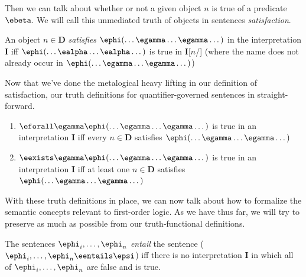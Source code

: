 Then we can talk about whether or not a given object $n$ is true of a predicate
$\ebeta$. We will call this unmediated truth of objects in sentences
\emph{satisfaction}.

\begin{definition}[Satisfaction]
  \label{def:fol-satisfaction}
  An object $n\in\mathbf{D}$ \emph{satisfies}
  $\ephi(\dots\egamma\dots\egamma\dots)$ in the interpretation \textbf{I} iff
  $\ephi(\dots\ealpha\dots\ealpha\dots)$ is true in \textbf{I}[$n$/\ealpha]
  (where the name \ealpha does not already occur in
  $\ephi(\dots\egamma\dots\egamma\dots)$)
\end{definition}

Now that we've done the metalogical heavy lifting in our definition of
satisfaction, our truth definitions for quantifier-governed sentences in
straight-forward.

\begin{definition}
  \label{def:fol-quantifier-truth}
  \begin{enumerate}
  \item $\eforall \egamma\ephi(\dots\egamma\dots\egamma\dots)$ is true in an
    interpretation \textbf{I} iff every $n\in\mathbf{D}$
    satisfies $\ephi(\dots\egamma\dots\egamma\dots)$
  \item $\eexists \egamma\ephi(\dots\egamma\dots\egamma\dots)$
    is true in an interpretation \textbf{I} iff at least one $n\in\mathbf{D}$
    satisfies $\ephi(\dots\egamma\dots\egamma\dots)$
  \end{enumerate}
\end{definition}


With these truth definitions in place, we can now talk about how to formalize
the semantic concepts relevant to first-order logic. As we have thus far, we
will try to preserve as much as possible from our truth-functional definitions.

\begin{definition}[Entailment]
  \label{def:fol-entailment}
  The sentences
  $\ephi_i,\dots,\ephi_n$
  \emph{entail} the sentence \epsi
  ($\ephi_i,\dots,\ephi_n\eentails\epsi$)
  iff there is no interpretation \textbf{I} in which all of
  $\ephi_i,\dots,\ephi_n$ are false and \epsi is true.  
\end{definition}

